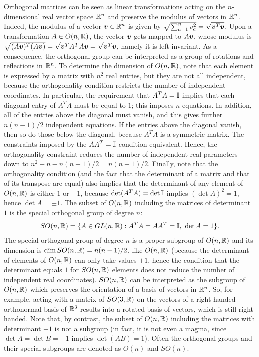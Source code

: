     Orthogonal matrices can be seen as linear transformations acting on the $n$-dimensional real vector space $\mathbb{R}^n$ and preserve the modulus of vectors in $\mathbb{R}^n$. Indeed, the modulus of a vector $\bm{v} \in \mathbb{R}^n$ is given by $\sqrt{\sum_{a=1}^n v_a^2} = \sqrt{\bm{v}^T \bm{v}}$. Upon a transformation $A \in O(n, \mathbb{R})$, the vector $\bm{v}$ gets mapped to $A\bm{v}$, whose modulus is $\sqrt{(A\bm{v})^T (A\bm{v})} = \sqrt{\bm{v}^T A^T A \bm{v}} = \sqrt{\bm{v}^T \bm{v}}$, namely it is left invariant. As a consequence, the orthogonal group can be interpreted as a group of rotations and reflections in $\mathbb{R}^n$. To determine the dimension of $O(n, \mathbb{R})$, note that each element is expressed by a matrix with $n^2$ real entries, but they are not all independent, because the orthogonality condition restricts the number of independent coordinates. In particular, the requirement that $A^T A = \mathbb{I}$ implies that each diagonal entry of $A^T A$ must be equal to $1$; this imposes $n$ equations. In addition, all of the entries above the diagonal must vanish, and this gives further $n(n-1)/2$ independent equations. If the entries above the diagonal vanish, then so do those below the diagonal, because $A^T A$ is a symmetric matrix. The constraints imposed by the $A A^T = \mathbb{I}$ condition equivalent. Hence, the orthogonality constraint reduces the number of independent real parameters down to $n^2 - n - n(n-1)/2 = n(n-1)/2$. Finally, note that the orthogonality condition (and the fact that the determinant of a matrix and that of its transpose are equal) also implies that the determinant of any element of $O(n, \mathbb{R})$ is either $1$ or $-1$, because $\det(A^T A) = \det \mathbb{I}$ implies $(\det A)^2 = 1$, hence $\det A = \pm 1$. The subset of $O(n, \mathbb{R})$ including the matrices of determinant $1$ is the special orthogonal group of degree $n$:
    \begin{equation}
        SO(n, \mathbb{R}) = \{ A \in GL(n, \mathbb{R}) : A^T A = A A^T = \mathbb{I},\ \det A = 1 \}.
    \end{equation}
    The special orthogonal group of degree $n$ is a proper subgroup of $O(n, \mathbb{R})$ and its dimension is $\dim SO(n, \mathbb{R}) = n(n-1)/2$, like $O(n, \mathbb{R})$ (because the determinant of elements of $O(n, \mathbb{R})$ can only take values $\pm 1$, hence the condition that the determinant equals $1$ for $SO(n, \mathbb{R})$ elements does not reduce the number of independent real coordinates). $SO(n, \mathbb{R})$ can be interpreted as the subgroup of $O(n, \mathbb{R})$ which preserves the orientation of a basis of vectors in $\mathbb{R}^n$. So, for example, acting with a matrix of $SO(3, \mathbb{R})$ on the vectors of a right-handed orthonormal basis of $\mathbb{R}^3$ results into a rotated basis of vectors, which is still right-handed. Note that, by contrast, the subset of $O(n, \mathbb{R})$ including the matrices with determinant $-1$ is not a subgroup (in fact, it is not even a magma, since $\det A = \det B = -1$ implies $\det(AB) = 1$). Often the orthogonal groups and their special subgroups are denoted as $O(n)$ and $SO(n)$.

